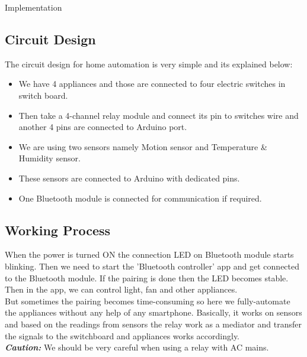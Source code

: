 \documentclass[12pt, oneside]{report}
\numberwithin{equation}{section}
\begin{document}
\begin{chapter}{Implementation}
\subsection{Circuit Design}
The circuit design for home automation is very simple and its explained below:
\begin{itemize}
\item We have 4 appliances and those are connected to four electric switches in switch board.
\item Then take a 4-channel relay module and connect its pin to switches wire and another 4 pins are connected to Arduino port.
\item We are using two sensors namely Motion sensor and Temperature \& Humidity sensor.
\item These sensors are connected to Arduino with dedicated pins.
\item One Bluetooth module is connected for communication if required. 
\end{itemize}

\subsection{Working Process}
When the power is turned ON the connection LED on Bluetooth module starts blinking. Then we need to start the 'Bluetooth controller' app and get connected to the Bluetooth module. If the pairing is done then the LED becomes stable. Then in the app, we can control light, fan and other appliances.\\
But sometimes the pairing becomes time-consuming so here we fully-automate the appliances without any help of any smartphone. Basically, it works on sensors and based on the readings from sensors the relay work as a mediator and transfer the signals to the switchboard and appliances works accordingly.\\
\textbf{\textit{Caution:}} We should be very careful when using a relay with AC mains.

\end{chapter}
\end{document}
